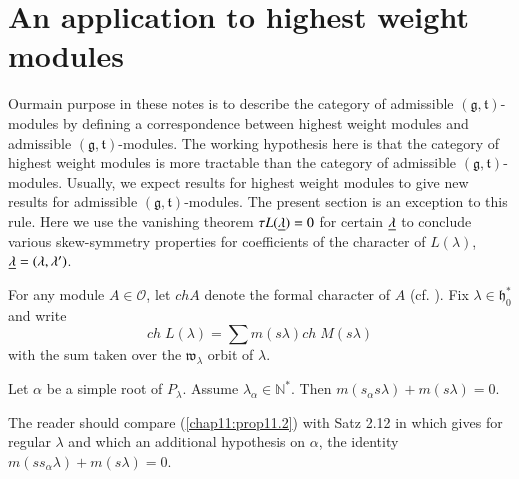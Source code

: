
\chapter{An application to highest weight modules}\label{sec11}

Our\pageoriginale main purpose in these notes is to describe the
category of admissible $(\mathfrak{g}, \mathfrak{t})$-modules by
defining a correspondence between highest weight modules and
admissible $(\mathfrak{g}, \mathfrak{t})$-modules. The working
hypothesis here is that the category of highest weight modules is more
tractable than the category of admissible $(\mathfrak{g},
\mathfrak{t})$-modules. Usually, we expect results for highest weight
modules to give new results for admissible $(\mathfrak{g},
\mathfrak{t})$-modules. The present section is an exception to this
rule. Here we use the vanishing theorem $\tau L(\underline{\lambda})=0$ for
certain $\underline{\lambda}$ to conclude various skew-symmetry properties for
coefficients of the character of $L(\lambda)$, $\underline{\lambda} =
(\lambda, \lambda')$. 


For any module $A \in \mathscr{O}$, let $ch A$ denote the formal
character of $A$ (cf. \cite{key24}). Fix $\lambda \in
\mathfrak{h}^*_0$ and write 
\begin{equation*}
ch \; L(\lambda) = \sum m (s\lambda) ch \; M (s\lambda) \tag{11.1}\label{eq11.1}
\end{equation*}
with the sum taken over the $\mathfrak{w}_\lambda$ orbit of
$\lambda$. 

\setcounter{prop}{1}
\begin{prop}\label{chap11:prop11.2}
Let $\alpha$ be a simple root of $P_\lambda$. Assume $\lambda_\alpha
\in \mathbb{N}^*$. Then $m(s_\alpha s\lambda) + m (s\lambda) = 0$. 
\end{prop}

The reader should compare (\ref{chap11:prop11.2}) with Satz 2.12 in \cite{key24} which
gives for regular $\lambda$ and which an additional hypothesis on
$\alpha$, the identity $m(ss_\alpha \lambda) + m(s\lambda) = 0$. 

